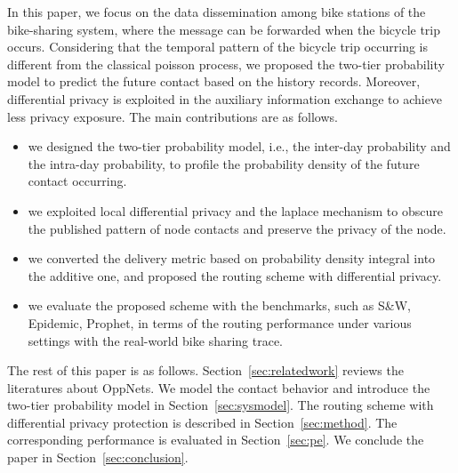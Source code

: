 In this paper, we focus on the data dissemination 
among bike stations of the bike-sharing system,
where the message can be forwarded when the bicycle trip occurs.  
Considering that the temporal pattern of the bicycle trip occurring 
is different from the classical poisson process,
we proposed the two-tier probability model
to predict the future contact based on the history records.
Moreover, differential privacy is exploited in the auxiliary information exchange
to achieve less privacy exposure.
The main contributions are as follows.
\begin{itemize}
\item {we designed the two-tier probability model,
i.e., the inter-day probability and the intra-day probability,
to profile the probability density of the future contact occurring.}
\item {we exploited local differential privacy and the laplace mechanism 
to obscure the published pattern of node contacts and preserve the privacy of the node.}
\item {we converted the delivery metric based on probability density integral into the additive one,
and proposed the routing scheme with differential privacy.}
\item {we evaluate the proposed scheme with the benchmarks,
such as S\&W, Epidemic, Prophet,
in terms of the routing performance under various settings
with the real-world bike sharing trace.}
\end{itemize}

The rest of this paper is as follows.
Section~\ref{sec:relatedwork} reviews the literatures about OppNets.
We model the contact behavior and introduce the two-tier probability model
in Section~\ref{sec:sysmodel}.
The routing scheme with differential privacy protection
is described in Section~\ref{sec:method}.
The corresponding performance is evaluated in Section~\ref{sec:pe}.
We conclude the paper in Section~\ref{sec:conclusion}.

